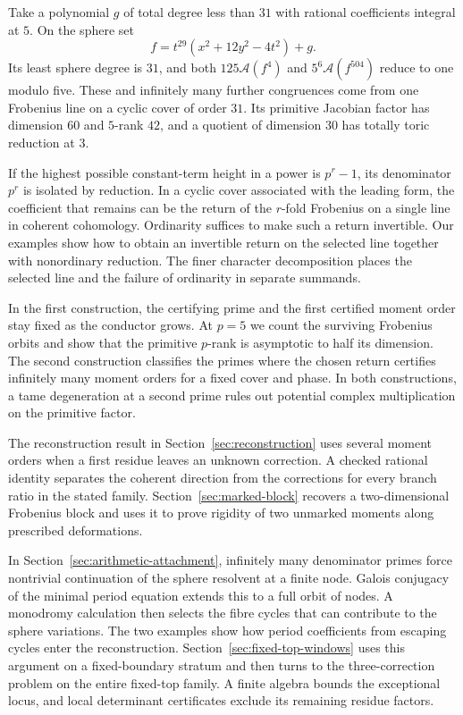 \documentclass[11pt]{article}
\newcommand{\A}{\mathcal A}
\begin{document}
Take a polynomial \(g\) of total degree less than \(31\) with rational
coefficients integral at \(5\). On the sphere set
\[
     f=t^{29}(x^2+12y^2-4t^2)+g.
\]
Its least sphere degree is \(31\), and both \(125\A(f^4)\) and
\(5^6\A(f^{504})\) reduce to one modulo five.
These and infinitely many further congruences come from one Frobenius line
on a cyclic cover of order \(31\). Its primitive Jacobian factor has
dimension \(60\) and \(5\)-rank \(42\), and a quotient of dimension
\(30\) has totally toric reduction at \(3\).

If the highest possible constant-term height in a power is \(p^r-1\),
its denominator \(p^r\) is isolated by reduction. In a cyclic cover
associated with the leading form, the coefficient that remains can be
the return of the \(r\)-fold Frobenius on a single line in coherent
cohomology. Ordinarity suffices to make such a return invertible.
Our examples show how to obtain an invertible return on the selected
line together with nonordinary reduction. The finer character
decomposition places the selected line and the failure of ordinarity
in separate summands.

In the first construction, the certifying prime and the first certified
moment order stay fixed as the conductor grows. At \(p=5\) we count the surviving
Frobenius orbits and show that the primitive \(p\)-rank is asymptotic to
half its dimension. The second construction classifies the primes
where the chosen return certifies infinitely many moment orders for a
fixed cover and phase. In both constructions,
a tame degeneration at a second prime rules out potential complex
multiplication on the primitive factor.

The reconstruction result in Section~\ref{sec:reconstruction}
uses several moment orders when a first residue leaves an unknown
correction. A checked rational identity separates the coherent
direction from the corrections for every branch ratio in the
stated family. Section~\ref{sec:marked-block} recovers a
two-dimensional Frobenius block and uses it to prove rigidity of
two unmarked moments along prescribed deformations.

In Section~\ref{sec:arithmetic-attachment}, infinitely many
denominator primes force nontrivial continuation of the
sphere resolvent at a finite node. Galois conjugacy of the
minimal period equation extends this to a full orbit of
nodes. A monodromy calculation then selects the fibre
cycles that can contribute to the sphere variations.
The two examples show how period coefficients from
escaping cycles enter the reconstruction. Section~\ref{sec:fixed-top-windows}
uses this argument on a fixed-boundary stratum and then turns to
the three-correction problem on the entire fixed-top family.
A finite algebra bounds the exceptional locus, and local determinant
certificates exclude its remaining residue factors.
\end{document}
